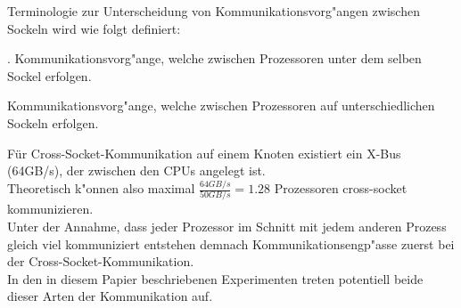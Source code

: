 Terminologie zur Unterscheidung von Kommunikationsvorg"angen zwischen Sockeln wird wie folgt definiert:\\
\begin{defi}.
Kommunikationsvorg"ange, welche zwischen Prozessoren unter dem selben Sockel erfolgen.
\end{defi}
\begin{defi}
Kommunikationsvorg"ange, welche zwischen Prozessoren auf unterschiedlichen Sockeln erfolgen.
\end{defi}
Für Cross-Socket-Kommunikation auf einem Knoten existiert ein X-Bus (64GB/s), der zwischen den CPUs angelegt ist.\\
Theoretisch k"onnen also maximal $\frac{64GB/s}{50GB/s} = 1.28$ Prozessoren cross-socket kommunizieren.\\
Unter der Annahme, dass jeder Prozessor im Schnitt mit jedem anderen Prozess gleich viel kommuniziert  entstehen demnach Kommunikationsengp"asse zuerst bei der Cross-Socket-Kommunikation.\\
In den in diesem Papier beschriebenen Experimenten treten potentiell beide dieser Arten der Kommunikation auf.

